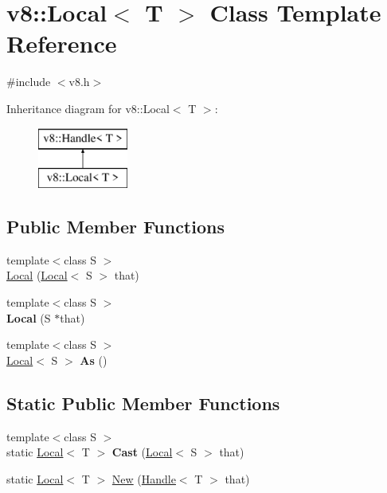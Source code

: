 \hypertarget{classv8_1_1_local}{}\section{v8\+:\+:Local$<$ T $>$ Class Template Reference}
\label{classv8_1_1_local}


{\ttfamily \#include $<$v8.\+h$>$}

Inheritance diagram for v8\+:\+:Local$<$ T $>$\+:\begin{figure}[H]
\begin{center}
\leavevmode
\includegraphics[height=2.000000cm]{classv8_1_1_local}
\end{center}
\end{figure}
\subsection*{Public Member Functions}
\begin{DoxyCompactItemize}
\item 
{\footnotesize template$<$class S $>$ }\\\hyperlink{classv8_1_1_local_af7cf8d2fe7e10a14ad382189712adaff}{Local} (\hyperlink{classv8_1_1_local}{Local}$<$ S $>$ that)
\item 
\hypertarget{classv8_1_1_local_aaa90419a2288a960d4a139ff226914b2}{}{\footnotesize template$<$class S $>$ }\\{\bfseries Local} (S $\ast$that)\label{classv8_1_1_local_aaa90419a2288a960d4a139ff226914b2}

\item 
\hypertarget{classv8_1_1_local_afd7f49264bab1faf07eee38beb6d5a0f}{}{\footnotesize template$<$class S $>$ }\\\hyperlink{classv8_1_1_local}{Local}$<$ S $>$ {\bfseries As} ()\label{classv8_1_1_local_afd7f49264bab1faf07eee38beb6d5a0f}

\end{DoxyCompactItemize}
\subsection*{Static Public Member Functions}
\begin{DoxyCompactItemize}
\item 
\hypertarget{classv8_1_1_local_a8e76791c0614ec0feed0e5a3a9d6e9f8}{}{\footnotesize template$<$class S $>$ }\\static \hyperlink{classv8_1_1_local}{Local}$<$ T $>$ {\bfseries Cast} (\hyperlink{classv8_1_1_local}{Local}$<$ S $>$ that)\label{classv8_1_1_local_a8e76791c0614ec0feed0e5a3a9d6e9f8}

\item 
static \hyperlink{classv8_1_1_local}{Local}$<$ T $>$ \hyperlink{classv8_1_1_local_ac4024a7e2aea140c6aaa38fc32d5a840}{New} (\hyperlink{classv8_1_1_handle}{Handle}$<$ T $>$ that)
\end{DoxyCompactItemize}


